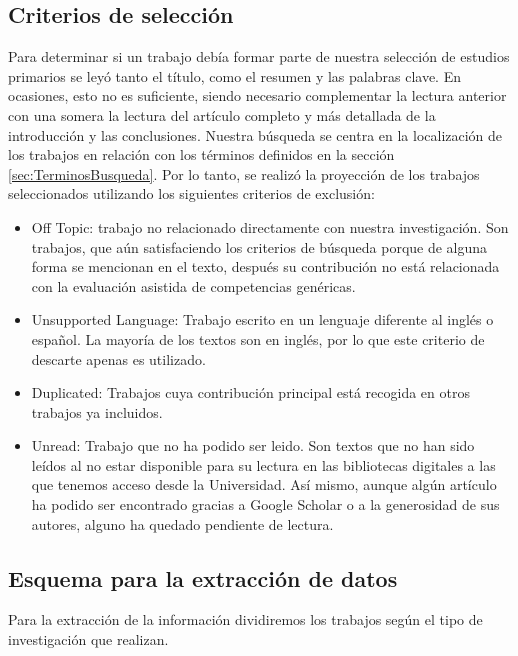 \subsection{Criterios de selección}
Para determinar si un trabajo debía formar parte de nuestra selección de estudios primarios se leyó tanto el título, como el resumen y las palabras clave. En ocasiones, esto no es suficiente, siendo necesario complementar la lectura anterior con una somera la lectura del artículo completo y más detallada de la introducción y las conclusiones.
Nuestra búsqueda se centra en la localización de los trabajos en relación con los términos definidos en la sección \ref{sec:TerminosBusqueda}. Por lo tanto, se realizó la proyección de los trabajos seleccionados utilizando los siguientes criterios de exclusión:
\begin{itemize}
\item Off Topic: trabajo no relacionado directamente con nuestra investigación. Son trabajos, que aún satisfaciendo los criterios de búsqueda porque de alguna forma se mencionan en el texto, después su contribución no está relacionada con la evaluación asistida de competencias genéricas.
\item Unsupported Language: Trabajo escrito en un lenguaje diferente al inglés o español. La mayoría de los textos son en inglés, por lo que este criterio de descarte apenas es utilizado.
\item Duplicated: Trabajos cuya contribución principal está recogida en otros trabajos ya incluidos. 
\item Unread: Trabajo que no ha podido ser leido. Son textos que no han sido leídos al no estar disponible para su lectura en las bibliotecas digitales a las que tenemos acceso desde la Universidad. Así mismo, aunque algún artículo ha podido ser encontrado gracias a Google Scholar o a la generosidad de sus autores, alguno ha quedado pendiente de lectura.
\end{itemize}

\subsection{Esquema para la extracción de datos}

Para la extracción de la información dividiremos los trabajos según el tipo de investigación que realizan.

